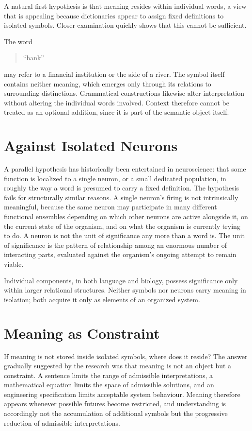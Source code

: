 \documentclass[11pt,oneside]{book}
\numberwithin{equation}{chapter}
\theoremstyle{definition}
\theoremstyle{plain}
\begin{document}
A natural first hypothesis is that meaning resides within individual words, a view that is appealing because dictionaries appear to assign fixed definitions to isolated symbols. Closer examination quickly shows that this cannot be sufficient.

The word

\begin{quote}
``bank''
\end{quote}

may refer to a financial institution or the side of a river. The symbol itself contains neither meaning, which emerges only through its relations to surrounding distinctions. Grammatical constructions likewise alter interpretation without altering the individual words involved. Context therefore cannot be treated as an optional addition, since it is part of the semantic object itself.

\section{Against Isolated Neurons}

A parallel hypothesis has historically been entertained in neuroscience: that some function is localized to a single neuron, or a small dedicated population, in roughly the way a word is presumed to carry a fixed definition. The hypothesis fails for structurally similar reasons. A single neuron's firing is not intrinsically meaningful, because the same neuron may participate in many different functional ensembles depending on which other neurons are active alongside it, on the current state of the organism, and on what the organism is currently trying to do. A neuron is not the unit of significance any more than a word is. The unit of significance is the pattern of relationship among an enormous number of interacting parts, evaluated against the organism's ongoing attempt to remain viable.

Individual components, in both language and biology, possess significance only within larger relational structures. Neither symbols nor neurons carry meaning in isolation; both acquire it only as elements of an organized system.

\section{Meaning as Constraint}

If meaning is not stored inside isolated symbols, where does it reside? The answer gradually suggested by the research was that meaning is not an object but a constraint. A sentence limits the range of admissible interpretations, a mathematical equation limits the space of admissible solutions, and an engineering specification limits acceptable system behaviour. Meaning therefore appears whenever possible futures become restricted, and understanding is accordingly not the accumulation of additional symbols but the progressive reduction of admissible interpretations.
\end{document}
